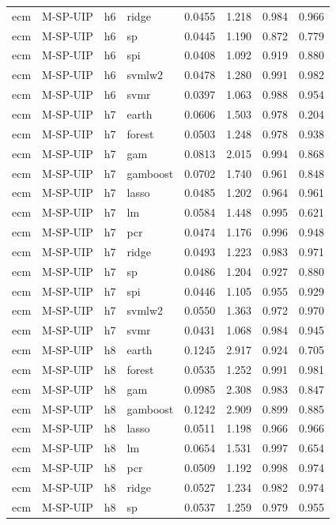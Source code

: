 \begin{ThreePartTable}
\begin{longtable}[t]{llclcccc}
ecm & M-SP-UIP & h6 & ridge & 0.0455 & 1.218 & 0.984 & 0.966\\
ecm & M-SP-UIP & h6 & sp & 0.0445 & 1.190 & 0.872 & 0.779\\
ecm & M-SP-UIP & h6 & spi & 0.0408 & 1.092 & 0.919 & 0.880\\
ecm & M-SP-UIP & h6 & svmlw2 & 0.0478 & 1.280 & 0.991 & 0.982\\
ecm & M-SP-UIP & h6 & svmr & 0.0397 & 1.063 & 0.988 & 0.954\\
\addlinespace
ecm & M-SP-UIP & h7 & earth & 0.0606 & 1.503 & 0.978 & 0.204\\
ecm & M-SP-UIP & h7 & forest & 0.0503 & 1.248 & 0.978 & 0.938\\
ecm & M-SP-UIP & h7 & gam & 0.0813 & 2.015 & 0.994 & 0.868\\
ecm & M-SP-UIP & h7 & gamboost & 0.0702 & 1.740 & 0.961 & 0.848\\
ecm & M-SP-UIP & h7 & lasso & 0.0485 & 1.202 & 0.964 & 0.961\\
ecm & M-SP-UIP & h7 & lm & 0.0584 & 1.448 & 0.995 & 0.621\\
ecm & M-SP-UIP & h7 & pcr & 0.0474 & 1.176 & 0.996 & 0.948\\
ecm & M-SP-UIP & h7 & ridge & 0.0493 & 1.223 & 0.983 & 0.971\\
ecm & M-SP-UIP & h7 & sp & 0.0486 & 1.204 & 0.927 & 0.880\\
ecm & M-SP-UIP & h7 & spi & 0.0446 & 1.105 & 0.955 & 0.929\\
ecm & M-SP-UIP & h7 & svmlw2 & 0.0550 & 1.363 & 0.972 & 0.970\\
ecm & M-SP-UIP & h7 & svmr & 0.0431 & 1.068 & 0.984 & 0.945\\
\addlinespace
ecm & M-SP-UIP & h8 & earth & 0.1245 & 2.917 & 0.924 & 0.705\\
ecm & M-SP-UIP & h8 & forest & 0.0535 & 1.252 & 0.991 & 0.981\\
ecm & M-SP-UIP & h8 & gam & 0.0985 & 2.308 & 0.983 & 0.847\\
ecm & M-SP-UIP & h8 & gamboost & 0.1242 & 2.909 & 0.899 & 0.885\\
ecm & M-SP-UIP & h8 & lasso & 0.0511 & 1.198 & 0.966 & 0.966\\
ecm & M-SP-UIP & h8 & lm & 0.0654 & 1.531 & 0.997 & 0.654\\
ecm & M-SP-UIP & h8 & pcr & 0.0509 & 1.192 & 0.998 & 0.974\\
ecm & M-SP-UIP & h8 & ridge & 0.0527 & 1.234 & 0.982 & 0.974\\
ecm & M-SP-UIP & h8 & sp & 0.0537 & 1.259 & 0.979 & 0.955\\

\end{longtable}
\end{ThreePartTable}
